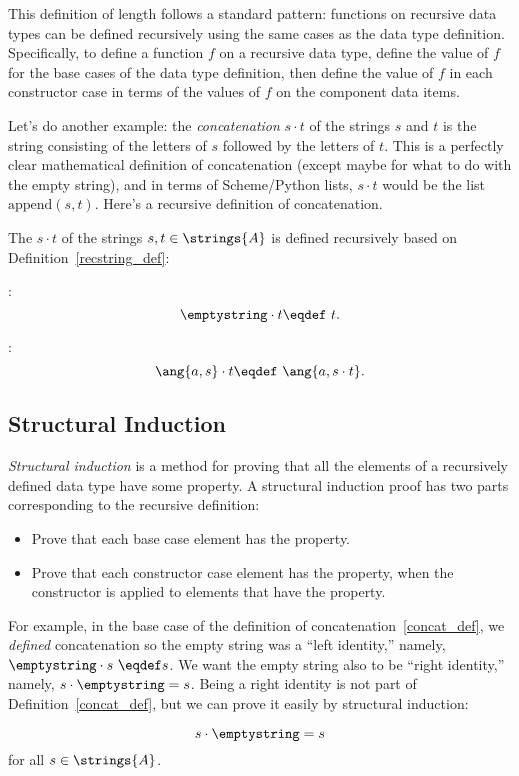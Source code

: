This definition of length follows a standard pattern: functions on
recursive data types can be defined recursively using the same cases
as the data type definition.  Specifically, to define a function $f$
on a recursive data type, define the value of $f$ for the base cases
of the data type definition, then define the value of $f$ in each
constructor case in terms of the values of $f$ on the component data
items.

Let's do another example: the \emph{concatenation} $s\cdot t$ of the
strings $s$ and $t$ is the string consisting of the letters of $s$
followed by the letters of $t$.  This is a perfectly clear
mathematical definition of concatenation (except maybe for what to do
with the empty string), and in terms of Scheme/Python lists, $s\cdot
t$ would be the list $\text{append}(s, t)$.  Here's a recursive
definition of concatenation.

\begin{definition}\label{concat_def}
The  $s\cdot t$ of the strings $s,t \in
\strings{A}$ is defined recursively based on
Definition~\ref{recstring_def}:

\item {}:     %
\[
\emptystring \cdot t \eqdef\ t.
\]

\item {}: %
\[
\ang{a,s} \cdot t \eqdef\ \ang{a, s \cdot t}.
\]
\end{definition}

\subsection{Structural Induction}

\emph{Structural induction}%
is a method for proving that all the elements
of a recursively defined data type have some property.  A structural
induction proof has two parts corresponding to the recursive definition:
\begin{itemize}
\item Prove that each base case element has the property.
\item Prove that each constructor case element has the property, when
  the constructor is applied to elements that have the property.
\end{itemize}

For example, in the base case of the definition of
concatenation~\ref{concat_def}, we \emph{defined} concatenation so the
empty string was a ``left identity,'' namely, $\emptystring \cdot
s\ \eqdef s$.  We want the empty string also to be ``right identity,''
namely, $s \cdot \emptystring = s$.  Being a right identity is not
part of Definition~\ref{concat_def}, but we can prove it easily by
structural induction:
\begin{lemma}\label{rightidempty}
\[
s \cdot \emptystring = s
\]
for all $s \in \strings{A}$.
\end{lemma}


